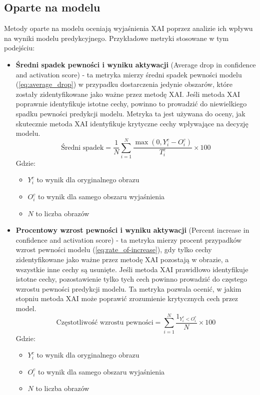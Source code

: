 \subsection*{Oparte na modelu}
Metody oparte na modelu oceniają wyjaśnienia XAI poprzez analizie ich wpływu na wyniki modelu predykcyjnego.
Przykładowe metryki stosowane w tym podejściu:
\begin{itemize}
	\item \textbf{Średni spadek pewności i wyniku aktywacji}\cite{9093360} (Average drop in confidence and activation score) - ta metryka mierzy średni spadek pewności modelu (\ref{eq:average_drop}) w przypadku dostarczenia jedynie obszarów, które zostały zidentyfikowane jako ważne przez metodę XAI.
	      Jeśli metoda XAI poprawnie identyfikuje istotne cechy, powinno to prowadzić do niewielkiego spadku pewności predykcji modelu.
	      Metryka ta jest używana do oceny, jak skutecznie metoda XAI identyfikuje krytyczne cechy wpływające na decyzję modelu.
	      \begin{equation}
		      \text{Średni spadek} = \frac{1}{N} \sum_{i=1}^{N} \frac{\max(0,Y_i^c-O_i^c)}{T_i^c} \times 100
		      \label{eq:average_drop}
	      \end{equation}
	      Gdzie:
	      \begin{itemize}[label=]
		      \item $Y_i^c$ to wynik dla oryginalnego obrazu
		      \item $O_i^c$ to wynik dla samego obszaru wyjaśnienia
		      \item $N$ to liczba obrazów
	      \end{itemize}
	\item \textbf{Procentowy wzrost pewności i wyniku aktywacji}\cite{9093360} (Percent increase in confidence and activation score) - ta metryka mierzy procent przypadków wzrost pewności modelu (\ref{eq:rate_of-increase}), gdy tylko cechy zidentyfikowane jako ważne przez metodę XAI pozostają w obrazie, a wszystkie inne cechy są usunięte.
	      Jeśli metoda XAI prawidłowo identyfikuje istotne cechy, pozostawienie tylko tych cech powinno prowadzić do częstego wzrostu pewności predykcji modelu.
	      Ta metryka pozwala ocenić, w jakim stopniu metoda XAI może poprawić zrozumienie krytycznych cech przez model.
	      \begin{equation}
		      \text{Częstotliwość wzrostu pewności} =  \sum_{i=1}^{N} \frac{1_{Y_i^c<O_i^c}}{N} \times 100
		      \label{eq:rate_of-increase}
	      \end{equation}
	      Gdzie:
	      \begin{itemize}[label=]
		      \item $Y_i^c$ to wynik dla oryginalnego obrazu
		      \item $O_i^c$ to wynik dla samego obszaru wyjaśnienia
		      \item $N$ to liczba obrazów
	      \end{itemize}
\end{itemize}

